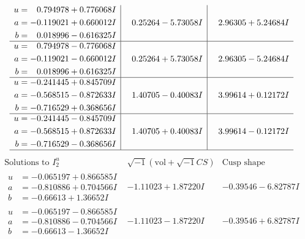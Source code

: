 \documentclass[1p]{elsarticle_modified}
\theoremstyle{definition}
\newcommand{\I}{\sqrt{-1}}
\begin{document}
$$\begin{array}{c|c|c}
\begin{aligned}
u &= \phantom{-}0.794978 + 0.776068 I \\
a &= -0.119021 + 0.660012 I \\
b &= \phantom{-}0.018996 - 0.616325 I\end{aligned}
 & \phantom{-}0.25264 - 5.73058 I & \phantom{-}2.96305 + 5.24684 I \\ \hline\begin{aligned}
u &= \phantom{-}0.794978 - 0.776068 I \\
a &= -0.119021 - 0.660012 I \\
b &= \phantom{-}0.018996 + 0.616325 I\end{aligned}
 & \phantom{-}0.25264 + 5.73058 I & \phantom{-}2.96305 - 5.24684 I \\ \hline\begin{aligned}
u &= -0.241445 + 0.845709 I \\
a &= -0.568515 - 0.872633 I \\
b &= -0.716529 + 0.368656 I\end{aligned}
 & \phantom{-}1.40705 - 0.40083 I & \phantom{-}3.99614 + 0.12172 I \\ \hline\begin{aligned}
u &= -0.241445 - 0.845709 I \\
a &= -0.568515 + 0.872633 I \\
b &= -0.716529 - 0.368656 I\end{aligned}
 & \phantom{-}1.40705 + 0.40083 I & \phantom{-}3.99614 - 0.12172 I\\
 \hline 
 \end{array}$$\newpage$$\begin{array}{c|c|c}  
\text{Solutions to }I^u_{2}& \I (\text{vol} + \sqrt{-1}CS) & \text{Cusp shape}\\
 \hline 
\begin{aligned}
u &= -0.065197 + 0.866585 I \\
a &= -0.810886 + 0.704566 I \\
b &= -0.66613 + 1.36652 I\end{aligned}
 & -1.11023 + 1.87220 I & -0.39546 - 6.82787 I \\ \hline\begin{aligned}
u &= -0.065197 - 0.866585 I \\
a &= -0.810886 - 0.704566 I \\
b &= -0.66613 - 1.36652 I\end{aligned}
 & -1.11023 - 1.87220 I & -0.39546 + 6.82787 I \\ \hline\begin{aligned}

\end{aligned}
\end{array}$$
\end{document}
